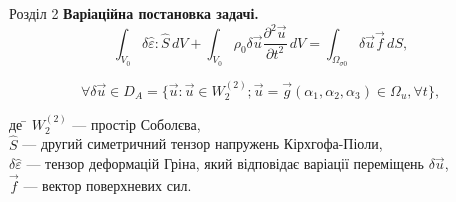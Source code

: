 \documentclass[8pt]{beamer}
\numberwithin{figure}{section}
\numberwithin{equation}{section}
\numberwithin{table}{section}
\begin{document}
\begin{frame}{Розділ 2}
\textbf{Варіаційна постановка задачі.}\\
\vspace{1em}
\begin{equation}\label{eq:virtwork_gen}
\int_{V_0} \delta\hat{\varepsilon}:\hat{S}\,dV+\int_{V_0} \rho_0 \delta\vec{u} \frac{\partial^2 \vec{u}}{\partial t ^2}\,dV=\int_{\Omega_{\sigma0}} \delta\vec{u} \vec{f} \,dS,
\end{equation}

\[
\forall \delta\vec{u} \in D_A 
= \{ 
\vec{u}:\vec{u}\in W_2^{(2)}; 
\vec{u}=\vec{g} \left( \alpha_1, \alpha_2,\alpha_3 \right) \in \Omega_{u}, \forall t \},
\]

\begin{tabbing}
де \= $ W_2^{(2)}$ --- простір Соболєва,\\
\> $\hat{S}$ --- другий симетричний тензор напружень Кірхгофа-Піоли,\\
\> $\delta\hat{\varepsilon}$ --- тензор деформацій Гріна, який відповідає варіації переміщень $\delta\vec{u}$,\\
\> $\vec{f}$ --- вектор поверхневих сил.
\end{tabbing}

\end{frame}
\end{document}
